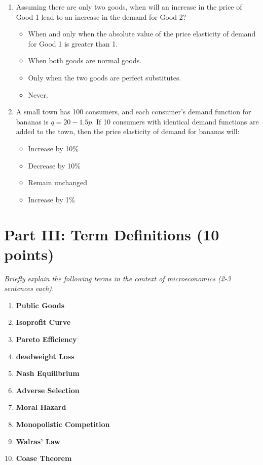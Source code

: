 \documentclass[12pt, a4paper]{article}
\begin{document}
\begin{enumerate}
\item Assuming there are only two goods, when will an increase in the price of Good 1 lead to an increase in the demand for Good 2?
    \begin{itemize}
        \item[A.] When and only when the absolute value of the price elasticity of demand for Good 1 is greater than 1.
        \item[B.] When both goods are normal goods.
        \item[C.] Only when the two goods are perfect substitutes.
        \item[D.] Never.
    \end{itemize}

\item A small town has 100 consumers, and each consumer's demand function for bananas is $q = 20 - 1.5p$. If 10 consumers with identical demand functions are added to the town, then the price elasticity of demand for bananas will:
    \begin{itemize}
        \item[A.] Increase by 10\%
        \item[B.] Decrease by 10\%
        \item[C.] Remain unchanged
        \item[D.] Increase by 1\%
    \end{itemize}

\end{enumerate}

\section*{Part III: Term Definitions (10 points)}
\textit{Briefly explain the following terms in the context of microeconomics (2-3 sentences each).}

\begin{enumerate}
    \item \textbf{Public Goods}
    \item \textbf{Isoprofit Curve}
    \item \textbf{Pareto Efficiency}
    \item \textbf{deadweight Loss}
    \item \textbf{Nash Equilibrium}
    \item \textbf{Adverse Selection}
    \item \textbf{Moral Hazard}
    \item \textbf{Monopolistic Competition} 
    \item \textbf{Walras’ Law}
    \item \textbf{Coase Theorem}
\end{enumerate}
\end{document}
